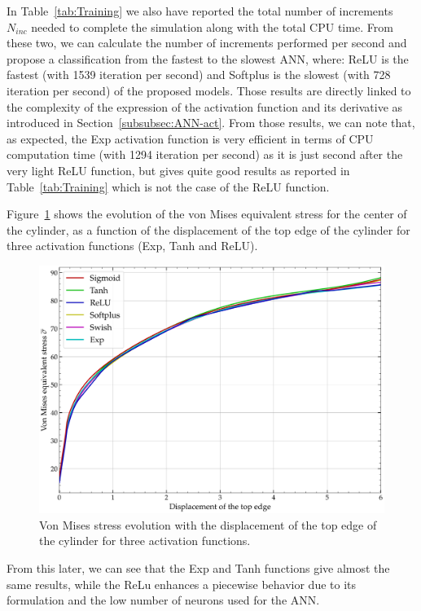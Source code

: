 \documentclass[algorithms,article,submit,pdftex,oneauthors]{Definitions/mdpi}
\begin{document}
In Table~\ref{tab:Training} we also have reported the total number of increments $N_{inc}$ needed to complete the simulation along with the total CPU time.
From these two, we can calculate the number of increments performed per second and propose a classification from the fastest to the slowest ANN, where: ReLU is the fastest (with 1539 iteration per second) and Softplus is the slowest (with 728 iteration per second) of the proposed models.
Those results are directly linked to the complexity of the expression of the activation function and its derivative as introduced in Section~\ref{subsubsec:ANN-act}. 
From those results, we can note that, as expected, the Exp activation function is very efficient in terms of CPU computation time (with 1294 iteration per second) as it is just second after the very light ReLU function, but gives quite good results as reported in Table~\ref{tab:Training} which is not the case of the ReLU function.

Figure~\ref{fig:Num-misesTH} shows the evolution of the von Mises equivalent stress for the center of the cylinder, as a function of the displacement of the top edge of the cylinder for three activation functions (Exp, Tanh and ReLU).
\begin{figure}[h!]
\centering
\includegraphics[width=0.8\columnwidth]{Figures/vonMises}
\caption{Von Mises stress evolution with the displacement of the top edge of the cylinder for three activation functions.}
\label{fig:Num-misesTH}
\end{figure}
From this later, we can see that the Exp and Tanh functions give almost the same results, while the ReLu enhances a piecewise behavior due to its formulation and the low number of neurons used for the ANN.

\end{document}
